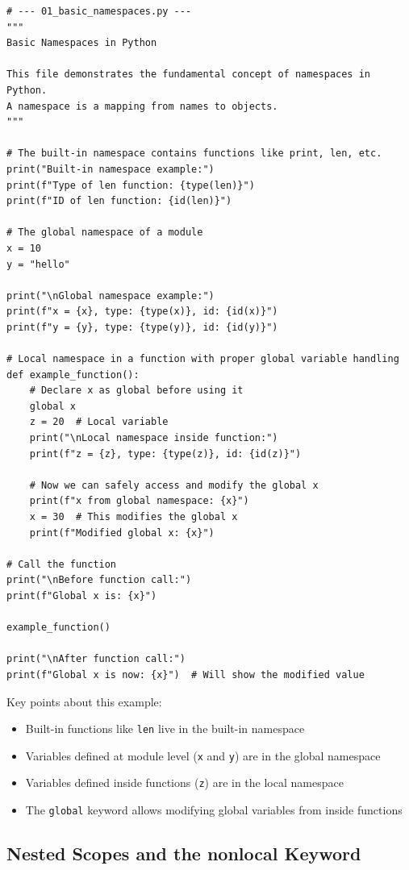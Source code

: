 \documentclass[12pt,letterpaper]{article}
\newcommand{\code}[1]{\texttt{\textcolor{accentColor}{#1}}}
\newenvironment{macterminal}{%
    \begin{mdframed}[
        linecolor=terminalFrame,
        backgroundcolor=terminalBg,
        roundcorner=5pt,
        skipabove=5pt,
        skipbelow=5pt,
        linewidth=1pt,
        innertopmargin=5pt,
        frametitle={%
            \tikz[baseline=(current bounding box.east), outer sep=0pt]{
                \fill[red!80!black] (0,0) circle (5pt);
                \fill[yellow!80!black] (0.7,0) circle (5pt);
                \fill[green!70!black] (1.4,0) circle (5pt);
            }
        },
        frametitlealignment=\raggedright,
        frametitleaboveskip=8pt,
        frametitlebelowskip=0pt,
    ]
}{%
    \end{mdframed}%
}
\begin{document}
\begin{macterminal}
\begin{lstlisting}
# --- 01_basic_namespaces.py ---
"""
Basic Namespaces in Python

This file demonstrates the fundamental concept of namespaces in Python.
A namespace is a mapping from names to objects.
"""

# The built-in namespace contains functions like print, len, etc.
print("Built-in namespace example:")
print(f"Type of len function: {type(len)}")
print(f"ID of len function: {id(len)}")

# The global namespace of a module
x = 10
y = "hello"

print("\nGlobal namespace example:")
print(f"x = {x}, type: {type(x)}, id: {id(x)}")
print(f"y = {y}, type: {type(y)}, id: {id(y)}")

# Local namespace in a function with proper global variable handling
def example_function():
    # Declare x as global before using it
    global x
    z = 20  # Local variable
    print("\nLocal namespace inside function:")
    print(f"z = {z}, type: {type(z)}, id: {id(z)}")
    
    # Now we can safely access and modify the global x
    print(f"x from global namespace: {x}")
    x = 30  # This modifies the global x
    print(f"Modified global x: {x}")

# Call the function
print("\nBefore function call:")
print(f"Global x is: {x}")

example_function()

print("\nAfter function call:")
print(f"Global x is now: {x}")  # Will show the modified value
\end{lstlisting}
\end{macterminal}

Key points about this example:
\begin{itemize}
    \item Built-in functions like \texttt{len} live in the built-in namespace
    \item Variables defined at module level (\code{x} and \code{y}) are in the global namespace
    \item Variables defined inside functions (\code{z}) are in the local namespace
    \item The \code{global} keyword allows modifying global variables from inside functions
\end{itemize}

\subsection{Nested Scopes and the nonlocal Keyword}
\end{document}
